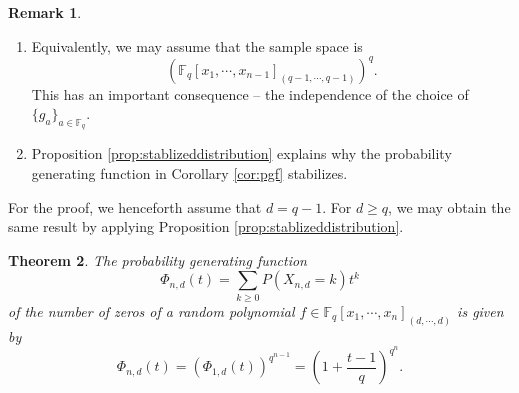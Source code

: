 \documentclass[12pt]{amsart}
\newtheorem{theorem}{Theorem}[section]
\theoremstyle{definition}
\newtheorem{remark}[theorem]{Remark}
\newcommand{\FF}{\mathbb{F} }
\begin{document}
\begin{remark}
\begin{enumerate}
\item Equivalently, we may assume that the sample space is 
\[
    (\FF_q[x_1, \cdots, x_{n-1}]_{(q-1, \cdots, q-1)})^q. 
\]
This has an important consequence -- the independence of the choice of $\{g_a\}_{a \in \FF_q}$.
\item Proposition \ref{prop:stablizeddistribution} explains why the probability generating function in Corollary \ref{cor:pgf} stabilizes. 
\end{enumerate}
\end{remark}

For the proof, we henceforth assume that $d = q-1$. For $d \ge q$, we may obtain the same result by applying Proposition \ref{prop:stablizeddistribution}.


\begin{theorem}\label{thm:distribution}
The probability generating function 
\[
    \Phi_{n,d}(t) = \sum_{k \ge 0}P(X_{n,d}=k)t^k
\]
of the number of zeros of a random polynomial $f \in \FF_q[x_1,\cdots,x_n]_{(d, \cdots, d)}$ is given by 
\[
    \Phi_{n,d}(t) = (\Phi_{1,d}(t))^{q^{n-1}} = \left(1+\frac{t-1}{q}\right)^{q^n}.
\]
\end{theorem}
\end{document}
